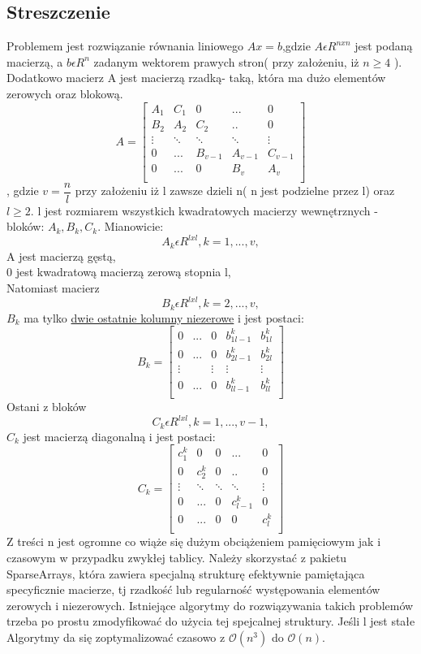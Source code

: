 \documentclass[11pt]{article}
\begin{document}
\begin{flushleft}
\subsection{Streszczenie}
Problemem jest rozwiązanie równania liniowego $Ax=b$,gdzie $A \epsilon R^{nxn}$ jest podaną macierzą, a $b \epsilon R^n$ zadanym wektorem prawych stron( przy założeniu, iż $n \geq 4$ ).
Dodatkowo macierz A jest macierzą rzadką- taką, która ma dużo elementów zerowych oraz blokową.
\[
A=\begin{bmatrix}
      A_1 & C_1 & 0 & ... & 0 \\
    B_2 & A_2 & C_2 & .. & 0 \\
    \vdots & \ddots & \ddots & \ddots & \vdots \\
     0 & ... & B_{v-1} & A_{v-1} & C_{v-1} \\
      0 & ... & 0 & B_v & A_v \\
  \end{bmatrix}
\]
, gdzie $v=\dfrac{n}{l}$ przy założeniu iż l zawsze dzieli n( n jest podzielne przez l) oraz $l\geq2$. l jest rozmiarem wszystkich kwadratowych macierzy wewnętrznych - bloków: $A_k, B_k, C_k$. Mianowicie: $$A_k \epsilon R^{lxl}, k = 1,...,v  ,$$ A jest macierzą gęstą, \\0 jest kwadratową macierzą zerową stopnia l,\\Natomiast macierz $$B_k \epsilon R^{lxl}, k = 2,...,v  ,$$ $B_k$ ma tylko \underline{dwie ostatnie kolumny niezerowe} i jest postaci:   
\[
B_k=\begin{bmatrix}
      0 & ... & 0 & b^k_{1l-1} & b^k_{1l} \\
      0 & ... & 0 & b^k_{2l-1} & b^k_{2l} \\
      \vdots &     & \vdots & \vdots & \vdots \\
      0 & ... & 0 & b^k_{ll-1} & b^k_{ll} \\
  \end{bmatrix}
\]
Ostani z bloków $$C_k \epsilon R^{lxl}, k = 1,...,v-1  ,$$ $C_k$ jest macierzą diagonalną i jest postaci:
\[
C_k=\begin{bmatrix}
      c^k_1 & 0 & 0 & ... & 0 \\
    0 & c^k_2 & 0 & .. & 0 \\
    \vdots & \ddots & \ddots & \ddots & \vdots \\
     0 & ... & 0 & c^k_{l-1} & 0 \\
      0 & ... & 0 & 0 & c^k_l \\
  \end{bmatrix}
\]
Z treści n jest ogromne co wiąże się dużym obciążeniem pamięciowym jak i czasowym w przypadku zwykłej tablicy. Należy skorzystać z pakietu SparseArrays, która zawiera specjalną strukturę efektywnie pamiętająca specyficznie macierze, tj rzadkość lub regularność występowania elementów zerowych i niezerowych. Istniejące algorytmy do rozwiązywania takich problemów trzeba po prostu zmodyfikować do użycia tej spejcalnej struktury. Jeśli l jest stałe Algorytmy da się zoptymalizować czasowo z $\mathcal{O}(n^3)$ do  $\mathcal{O}(n)$.\\

\end{flushleft}
\end{document}
